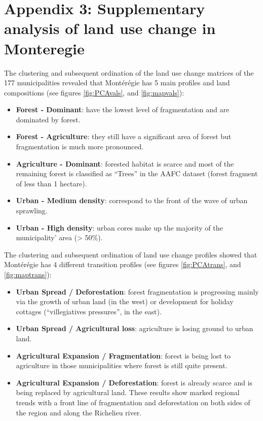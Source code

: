 
\chapter*{\textbf{Appendix 3: Supplementary analysis of land use change in Monteregie \\ \hspace{1em}}}

\setcounter{chapter}{5}
\setcounter{table}{0}
\setcounter{figure}{0}

The clustering and subsequent ordination of the land use change matrices of the 177 municipalities revealed that Montérégie has 5 main profiles and land compositions (see figures \ref{fig:PCAvals}, and \ref{fig:mapvals}):
\renewcommand{\labelitemi}{$\textendash$}
\begin{itemize}[leftmargin=0.5cm]
 \item \textbf{Forest - Dominant}: have the lowest level of fragmentation and are dominated by forest.
 \item \textbf{Forest - Agriculture}: they still have a significant area of forest but fragmentation is much more pronounced.
 \item \textbf{Agriculture - Dominant}: forested habitat is scarce and most of the remaining forest is classified as “Trees” in the AAFC dataset (forest fragment of less than 1 hectare).
 \item \textbf{Urban - Medium density}: correspond to the front of the wave of urban sprawling.
 \item \textbf{Urban - High density}: urban cores make up the majority of the municipality’ area (> 50\%).
\end{itemize}

The clustering and subsequent ordination of land use change profiles showed that Montérégie has 4 different transition profiles (see figures \ref{fig:PCAtrans}, and \ref{fig:maptrans}):
\begin{itemize}[leftmargin=0.5cm]
 \item \textbf{Urban Spread / Deforestation}: forest fragmentation is progressing mainly via the growth of urban land (in the west) or development for holiday cottages (“villegiatives pressures”, in the east).
 \item \textbf{Urban Spread / Agricultural loss}: agriculture is losing ground to urban land.
 \item \textbf{Agricultural Expansion / Fragmentation}: forest is being lost to agriculture in those municipalities where forest is still quite present.
 \item \textbf{Agricultural Expansion / Deforestation}: forest is already scarce and is being replaced by agricultural land.
These results show marked regional trends with a front line of fragmentation and deforestation on both sides of the region and along the Richelieu river. \\ %
\end{itemize}

